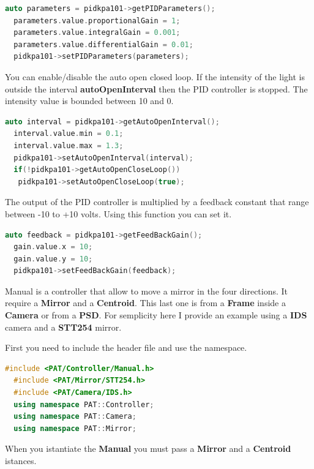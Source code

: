 \begin{lstlisting}[language=c++, gobble=2]
  auto parameters = pidkpa101->getPIDParameters();
  parameters.value.proportionalGain = 1;
  parameters.value.integralGain = 0.001;
  parameters.value.differentialGain = 0.01;
  pidkpa101->setPIDParameters(parameters);
\end{lstlisting}


You can enable/disable the auto open closed loop. If the intensity of
the light is outside the interval \textbf{autoOpenInterval} then the PID
controller is stopped. The intensity value is bounded between 10 and 0.

\begin{lstlisting}[language=c++, gobble=2]
  auto interval = pidkpa101->getAutoOpenInterval();
  interval.value.min = 0.1;
  interval.value.max = 1.3;
  pidkpa101->setAutoOpenInterval(interval);
  if(!pidkpa101->getAutoOpenCloseLoop())
   pidkpa101->setAutoOpenCloseLoop(true);
\end{lstlisting}

The output of the PID controller is multiplied by a feedback constant
that range between -10 to +10 volts. Using this function you can set
it.

\begin{lstlisting}[language=c++, gobble=2]
  auto feedback = pidkpa101->getFeedBackGain();
  gain.value.x = 10;
  gain.value.y = 10;
  pidkpa101->setFeedBackGain(feedback);
\end{lstlisting}



Manual is a controller that allow to move a mirror in the four
directions. It require a \textbf{Mirror} and a \textbf{Centroid}. This
last one is from a \textbf{Frame} inside a \textbf{Camera} or from a
\textbf{PSD}. For semplicity here I provide an example using a
\textbf{IDS} camera and a \textbf{STT254} mirror.

First you need to include the header file and use the namespace.

\begin{lstlisting}[language=c++, gobble=2]
  #include <PAT/Controller/Manual.h>
  #include <PAT/Mirror/STT254.h>
  #include <PAT/Camera/IDS.h>
  using namespace PAT::Controller;
  using namespace PAT::Camera;
  using namespace PAT::Mirror;
\end{lstlisting}


When you istantiate the \textbf{Manual} you must pass a \textbf{Mirror}
and a \textbf{Centroid} istances.

